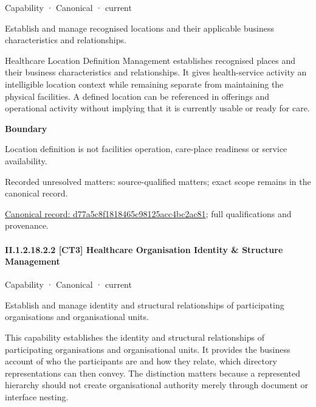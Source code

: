 \label{element:d77a5c8f1818465c98125acc4bc2ac81}
{\small Capability · Canonical · current}\par

Establish and manage recognised locations and their applicable business characteristics and relationships.



Healthcare Location Definition Management establishes recognised places and their business characteristics and relationships. It gives health-service activity an intelligible location context while remaining separate from maintaining the physical facilities. A defined location can be referenced in offerings and operational activity without implying that it is currently usable or ready for care.



\textbf{Boundary}



Location definition is not facilities operation, care-place readiness or service availability.


{\small Recorded unresolved matters: source-qualified matters; exact scope remains in the canonical record.}\par
{\footnotesize \href{../../../../../../../continuum/strategy/capability/d77a5c8f1818465c98125acc4bc2ac81.md}{Canonical record: d77a5c8f1818465c98125acc4bc2ac81}; full qualifications and provenance.}\par
\paragraph*{II.1.2.18.2.2 [CT3] Healthcare Organisation Identity \& Structure Management}
\label{navigation:II.1.2.18.2.2}

\label{element:4684348b4d144e61aa7dd203facfebdd}
{\small Capability · Canonical · current}\par

Establish and manage identity and structural relationships of participating organisations and organisational units.



This capability establishes the identity and structural relationships of participating organisations and organisational units. It provides the business account of who the participants are and how they relate, which directory representations can then convey. The distinction matters because a represented hierarchy should not create organisational authority merely through document or interface nesting.




